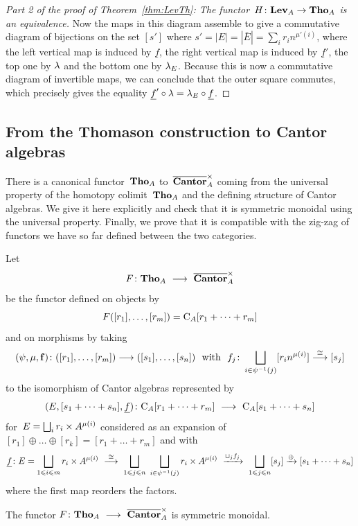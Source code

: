 \begin{proof}[Part 2 of the proof of Theorem~\ref{thm:LevTh}: The functor~$H\colon\mathbf{Lev}_A\to \mathbf{Tho}_A$ is an equivalence]
Now the maps in this diagram assemble to give a commutative diagram of bijections on the set $[s']$ where $s'=|E|=|\bar E|=\sum_ir_in^{\mu'(i)}$, where the left vertical map is induced by $\underline f$, the right vertical  map is induced by $\underline f'$, the top one by $\lambda$ and the bottom one by $\lambda_E$. Because this is now a commutative diagram of invertible maps, we can conclude that the outer square commutes, which precisely  gives the equality $\underline f'\circ \lambda=\lambda_E\circ \underline f$. 
\end{proof}

\subsection{From the Thomason construction to Cantor algebras}\label{sec:square}

There is a canonical functor~$\mathbf{Tho}_A$ to~$\overline{\mathbf{Cantor}}_A^\times$ coming from the universal property of the homotopy colimit~$\mathbf{Tho}_A$ and the defining structure of Cantor algebras. We give it here explicitly and check that it is symmetric monoidal using the universal property. Finally, we prove that it is compatible with the zig-zag of functors we have so far defined between the two categories. 

Let
\[
F\colon\Tho_A\ \rar\ \bCan_A^\x
\]
be the functor defined on objects by 
$$F([r_1],\dots,[r_m])=\mathrm{C}_A[r_1+\dots+r_m]$$
and on morphisms by taking 
$$(\psi,\mu,{\bf f})\colon([r_1],\dots,[r_m])\rar ([s_1],\dots,[s_n]) \ \ \textrm{with}\ \ f_j\colon\bigsqcup_{i\in\psi^{-1}(j)}[r_in^{\mu(i)}]\stackrel{\cong}\rar [s_j]$$
to the isomorphism of Cantor algebras represented by 
$$(E,[s_1+\dots+s_n],\underline f)\colon\mathrm{C}_A[r_1+\dots+r_m]\ \longrightarrow \ \mathrm{C}_A[s_1+\dots+s_n]$$
for~$E=\bigsqcup_i r_i\times A^{\mu(i)}$ considered as an expansion of~$[r_1]\oplus\dots\oplus[r_k]=[r_1+\dots+r_m]$ and with 
$$\underline f\colon E=\bigsqcup_{1\le i\le m}r_i\x A^{\mu(i)} \ \stackrel{\cong}\rar\ \bigsqcup_{1\le j\le n}\ \bigsqcup_{i\in \psi^{-1}(j)} r_i\x A^{\mu(i)}\ \xrightarrow{\sqcup_j f_j}\ \bigsqcup_{1\le j\le n} [s_j]\xrightarrow{\oplus} [s_1+\dots+s_n]$$
where the first map reorders the factors. 

\begin{prop}
The functor $F\colon\Tho_A\ \rar\ \bCan_A^\x$ is symmetric monoidal. 
\end{prop}

